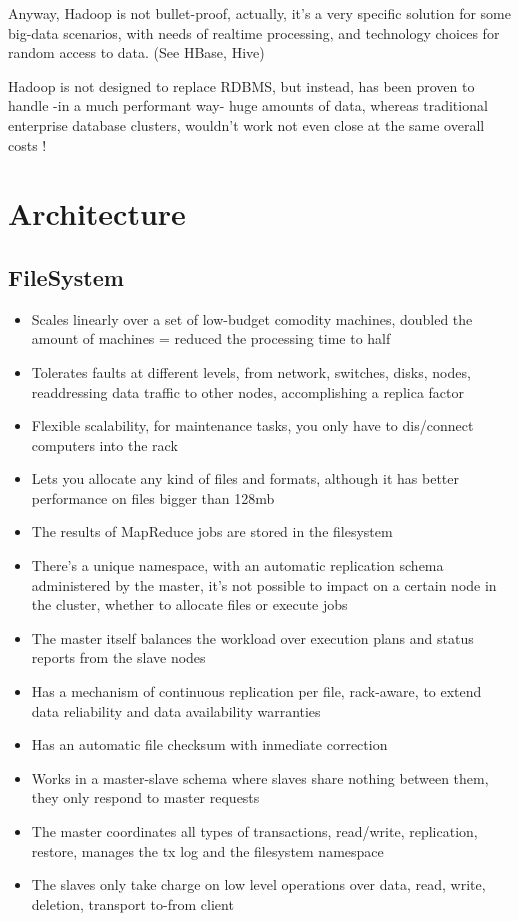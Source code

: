 Anyway, Hadoop is not bullet-proof, actually, it's a very specific solution for some big-data scenarios, with needs of realtime processing, and technology choices for random access to data. (See HBase, Hive)

Hadoop is not designed to replace RDBMS, but instead, has been proven to handle -in a much performant way- huge amounts of data, whereas traditional enterprise database clusters, wouldn't work not even close at the same overall costs !

\chapter{Architecture}

\section{FileSystem}
\begin{itemize}
\item Scales linearly over a set of low-budget comodity machines, doubled the amount of machines = reduced the processing time to half
\item Tolerates faults at different levels, from network, switches, disks, nodes, readdressing data traffic to other nodes, accomplishing a replica factor
\item Flexible scalability, for maintenance tasks, you only have to dis/connect computers into the rack
\item Lets you allocate any kind of files and formats, although it has better performance on files bigger than 128mb
\item The results of MapReduce jobs are stored in the filesystem
\item There's a unique namespace, with an automatic replication schema administered by the master, it's not possible to impact on a certain node in the cluster, whether to allocate files or execute jobs
\item The master itself balances the workload over execution plans and status reports from the slave nodes
\item Has a mechanism of continuous replication per file, rack-aware, to extend data reliability and data availability warranties
\item Has an automatic file checksum with inmediate correction
\item Works in a master-slave schema where slaves share nothing between them, they only respond to master requests
\item The master coordinates all types of transactions, read/write, replication, restore, manages the tx log and the filesystem namespace
\item The slaves only take charge on low level operations over data, read, write, deletion, transport to-from client
\end{itemize}

